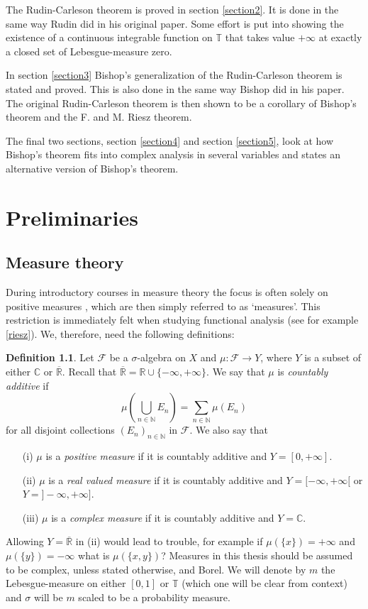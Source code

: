 \documentclass[a4paper,12pt,twoside,BCOR=10mm]{scrbook}
\theoremstyle{definition}
\theoremstyle{definition}
\theoremstyle{definition}
\newtheorem{definition}[theorem]{Definition}
\begin{document}
The Rudin-Carleson theorem is proved in section \ref{section2}.
It is done in the same way Rudin did in his original paper.
Some effort is put into showing the existence of a continuous integrable function on $\mathbb{T}$ that takes value $+\infty$ at exactly a closed set of Lebesgue-measure zero.

In section \ref{section3} Bishop's generalization of the Rudin-Carleson theorem is stated and proved.
This is also done in the same way Bishop did in his paper.
The original Rudin-Carleson theorem is then shown to be a corollary of Bishop's theorem and the F. and M. Riesz theorem.

The final two sections, section \ref{section4} and section \ref{section5}, look at how Bishop's theorem fits into complex analysis in several variables and states an alternative version of Bishop's theorem.
\chapter{Preliminaries}
\section{Measure theory}
During introductory courses in measure theory the focus is often solely on positive measures \citep{tao}, which are then simply referred to as `measures'.
This restriction is immediately felt when studying functional analysis (see for example \ref{riesz}).
We, therefore, need the following definitions:
\begin{definition}
\label{index1}
Let $\mathcal{F}$ be a $\sigma$-algebra on $X$ and $\mu: \mathcal{F} \rightarrow Y$, where $Y$ is a subset of either $\mathbb{C}$ or $\overline{\mathbb{R}}$.
Recall that $\overline{\mathbb{R}} = \mathbb{R} \cup \{-\infty, +\infty\}$.
We say that $\mu$ is \emph{countably additive} if
\[
	\mu\left( \bigcup_{n \in \mathbb{N}} E_n \right ) = \sum_{n \in \mathbb{N}} \mu(E_n)
\]
for all disjoint collections $(E_n)_{n \in \mathbb{N}}$ in $\mathcal{F}$.
We also say that
\begin{enumerate}
\item[(i)] $\mu$ is a \emph{positive measure} if it is countably additive and $Y = [0, +\infty]$.
\item[(ii)] $\mu$ is a \emph{real valued measure} if it is countably additive and $Y = [-\infty, +\infty[$ or $Y = ]-\infty, +\infty]$.
\item[(iii)] $\mu$ is a \emph{complex measure} if it is countably additive and $Y = \mathbb{C}$.
\end{enumerate}
\end{definition}
Allowing $Y = \overline{\mathbb{R}}$ in (ii) would lead to trouble, for example if $\mu(\{x\}) = +\infty$ and $\mu(\{y\}) = -\infty$ what is $\mu(\{x, y\})$?
Measures in this thesis should be assumed to be complex, unless stated otherwise, and Borel.
We will denote by $m$ the Lebesgue-measure on either $[0, 1]$ or $\mathbb{T}$ (which one will be clear from context) and $\sigma$ will be $m$ scaled to be a probability measure.
\end{document}
